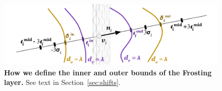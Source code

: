 \begin{figure}[t]
  \centering
  \includegraphics[width=\linewidth]{images/ray_w_mesh.pdf}
  \caption{
  \textbf{How we define the inner and outer bounds of the Frosting layer.} See text in Section~\ref{sec:shifts}.}
  \label{fig:shifts}
\end{figure}
